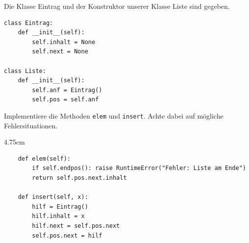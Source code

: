 \question[4]
Die Klasse Eintrag und der Konstruktor unserer Klasse Liste sind gegeben.
\begin{lstlisting}
class Eintrag:
    def __init__(self):
        self.inhalt = None
        self.next = None

class Liste:
    def __init__(self):
        self.anf = Eintrag()
        self.pos = self.anf
\end{lstlisting}
Implementiere die Methoden \texttt{elem} und \texttt{insert}. Achte dabei auf mögliche Fehlersituationen.
\begin{solutionbox}{4.75cm}
\begin{lstlisting}
    def elem(self):
        if self.endpos(): raise RuntimeError("Fehler: Liste am Ende")
        return self.pos.next.inhalt

    def insert(self, x):
        hilf = Eintrag()
        hilf.inhalt = x
        hilf.next = self.pos.next
        self.pos.next = hilf
\end{lstlisting}
\end{solutionbox}
